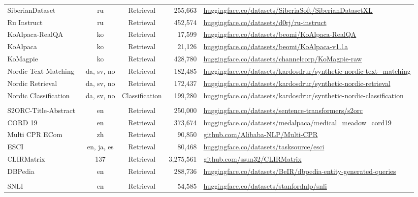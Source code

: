 \begin{table}[th]
{\begin{tabular}{lccrm{9cm}}
SiberianDataset~\citep{2023SiberianDatasetXL} & ru & Retrieval & 255,663 & \url{huggingface.co/datasets/SiberiaSoft/SiberianDatasetXL} \\
Ru Instruct~\citep{2024ru-instruct-translated} & ru & Retrieval & 452,574 & \url{huggingface.co/datasets/d0rj/ru-instruct} \\
KoAlpaca-RealQA~\citep{2024koalpaca_realqa} & ko & Retrieval & 17,599 & \url{huggingface.co/datasets/beomi/KoAlpaca-RealQA} \\
KoAlpaca~\citep{2023koalpaca} & ko & Retrieval & 21,126 & \url{huggingface.co/datasets/beomi/KoAlpaca-v1.1a} \\
KoMagpie~\citep{2024komagpie} & ko & Retrieval & 428,780 & \url{huggingface.co/datasets/channelcorp/KoMagpie-raw} \\
Nordic Text Matching~\citep{2025nordic_text_matching} & da, sv, no & Retrieval & 182,485 & \url{huggingface.co/datasets/kardosdrur/synthetic-nordic-text_matching} \\
Nordic Retrieval~\citep{2025nordic_retrieval} & da, sv, no & Retrieval & 172,437 & \url{huggingface.co/datasets/kardosdrur/synthetic-nordic-retrieval} \\
Nordic Classification~\citep{2025nordic_classification} & da, sv, no & Classification & 199,280 & \url{huggingface.co/datasets/kardosdrur/synthetic-nordic-classification} \\
\midrule
\rowcolor{gray!15} \multicolumn{5}{c}{Title Matching}\\
S2ORC-Title-Abstract~\citep{2020S2ORC} & en & Retrieval & 250,000 & \url{huggingface.co/datasets/sentence-transformers/s2orc} \\
CORD 19~\citep{2020cord19} & en & Retrieval & 373,674 & \url{huggingface.co/datasets/medalpaca/medical_meadow_cord19} \\
Multi CPR ECom~\citep{2022multicprmedical} & zh & Retrieval & 90,850 & \url{github.com/Alibaba-NLP/Multi-CPR} \\
ESCI~\citep{2022esci} & en, ja, es & Retrieval & 80,468 & \url{huggingface.co/datasets/tasksource/esci} \\
CLIRMatrix~\citep{2020clirmatrix} & 137 & Retrieval & 3,275,561 & \url{github.com/ssun32/CLIRMatrix} \\
DBPedia~\citep{2017dbpedia} & en & Retrieval & 288,736 & \url{huggingface.co/datasets/BeIR/dbpedia-entity-generated-queries} \\
\midrule
\rowcolor{gray!15} \multicolumn{5}{c}{NLI}\\
SNLI~\citep{2015SNLI} & en & Retrieval & 54,585 & \url{huggingface.co/datasets/stanfordnlp/snli} \\

\end{tabular}}
\end{table}
